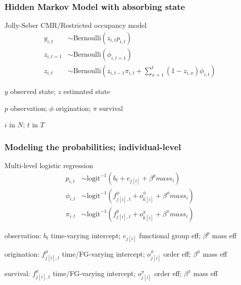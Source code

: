\documentclass{beamer}
\begin{document}
\appendix





\begin{frame}
  \frametitle{Hidden Markov Model with absorbing state}
  \begin{block}{Jolly-Seber CMR/Restricted occupancy model}
    \setlength\abovedisplayskip{-0.3cm}
    \begin{align*}
      y_{i, t} &\sim \text{Bernoulli}(z_{i, t} p_{i, t}) \\
      z_{i, t = 1} &\sim \text{Bernoulli}(\phi_{i, t = 1}) \\
      z_{i, t} &\sim \text{Bernoulli}\left(z_{i, t - 1} \pi_{i,t} + \sum_{x = 1}^{t}(1 - z_{i, x}) \phi_{i, t}\right)
    \end{align*}
    \begin{scriptsize}
      \(y\) observed state; \(z\) estimated state

      \(p\) observation; \(\phi\) origination; \(\pi\) survival

      \(i\) in \(N\); \(t\) in \(T\)
    \end{scriptsize}
  \end{block}
\end{frame}

\begin{frame}
  \frametitle{Modeling the probabilities; individual-level}
  \begin{block}{Multi-level logistic regression}
    \setlength\abovedisplayskip{-0.3cm}
    \begin{align*}
      p_{i, t} &\sim \text{logit}^{-1}(b_{t} + e_{j[i]} + \beta^{p} mass_{i}) \\
      \phi_{i, t} &\sim \text{logit}^{-1}(f^{\phi}_{j[i], t} + o^{\phi}_{k[i]} + \beta^{\phi} mass_{i}) \\
      \pi_{i, t} &\sim \text{logit}^{-1}(f^{\pi}_{j[i], t} + o^{\pi}_{k[i]} + \beta^{\pi} mass_{i})
    \end{align*}
    \begin{scriptsize}
      observation: \(b_{t}\) time-varying intercept; \(e_{j[i]}\) functional group eff; \(\beta^{p}\) mass eff

      origination: \(f^{\phi}_{j[i], t}\) time/FG-varying intercept; \(o^{\phi}_{j[i]}\) order eff; \(\beta^{\phi}\) mass eff

      survival: \(f^{\pi}_{j[i], t}\) time/FG-varying intercept; \(o^{\pi}_{j[i]}\) order eff; \(\beta^{\pi}\) mass eff
    \end{scriptsize}
  \end{block}
\end{frame}
\end{document}
